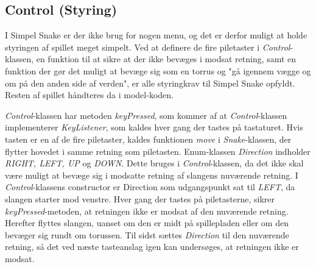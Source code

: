 \subsection{Control (Styring)}
I Simpel Snake er der ikke brug for nogen menu, og det er derfor muligt at holde styringen af spillet meget simpelt. Ved at definere de fire piletaster i \textit{Control}-klassen, en funktion til at sikre at der ikke bevæges i modsat retning, samt en funktion der gør det muligt at bevæge sig som en torrus og "gå igennem vægge og om på den anden side af verden", er alle styringkrav til Simpel Snake opfyldt. Resten af spillet håndteres da i model-koden.

\textit{Control}-klassen har metoden \textit{keyPressed}, som kommer af at \textit{Control}-klassen implementerer \textit{KeyListener}, som kaldes hver gang der tastes på tastaturet. Hvis tasten er en af de fire piletaster, kaldes funktionen \textit{move} i \textit{Snake}-klassen, der flytter hovedet i samme retning som piletasten.
Enum-klassen \textit{Direction} indholder \textit{RIGHT, LEFT, UP} og \textit{DOWN}. Dette bruges i \textit{Control}-klassen, da det ikke skal være muligt at bevæge sig i modsatte retning af slangens nuværende retning.
I \textit{Control}-klassens constructor er Direction som udgangspunkt sat til \textit{LEFT}, da slangen starter mod venstre. Hver gang der tastes på piletasterne, sikrer \textit{keyPressed}-metoden, at retningen ikke er modsat af den nuværende retning. Herefter flyttes slangen, uanset om den er midt på spillepladen eller om den bevæger sig rundt om torussen. Til sidst sættes \textit{Direction} til den nuværende retning, så det ved næste tasteanslag igen kan undersøges, at retningen ikke er modsat.
